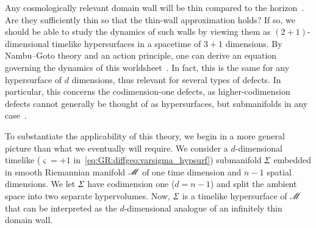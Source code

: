 



\newcommand*\hypsurf{\ALIAShypsurf}             %
\newcommand*\sppt{\ALIASsppt}                   %
\newcommand*\pert{\ALIASpert}                   %
\newcommand*\hypacc{\widehat}                   %
\newcommand*\Ft{\ALIASFt}                       %
\newcommand*\dummy{\ALIASdummy}                 %
\newcommand*\Tw{\ALIASTw}
\newcommand*\Twf{\ALIASTwf}







Any cosmologically relevant domain wall will be thin compared to the horizon~\citep{pressDynamicalEvolutionDomain1989}. Are they sufficiently thin so that the thin-wall approximation holds? If so, we should be able to study the dynamics of such walls by viewing them as $(2+1)$-dimensional timelike hypersurfaces in a spacetime of $3+1$ dimensions. 
By Nambu--Goto theory and an action principle, one can derive an equation governing the dynamics of this worldsheet~\citep{vilenkinCosmicStringsOther1994}. In fact, this is the same for any hypersurface of $d$ dimensions, thus relevant for several types of defects. In particular, this concerns the codimension-one defects, as higher-codimension defects cannot generally be thought of as hypersurfaces, but submanifolds in any case~\citep{vachaspatiKinksDomainWalls2006}. 




To substantiate the applicability of this theory, we begin in a more general picture than what we eventually will require. We consider a $d$-dimensional timelike ($\varsigma = +1$ in~\cref{eq:GR:diffgeo:varsigma_hypsurf}) submanifold $\hypsurf$ embedded in smooth Riemannian manifold $\mathscr{M}$ of one time dimension and $n-1$ spatial dimensions. 
We let $\hypsurf$ have codimension one ($d=n-1$) and split the ambient space into two separate hypervolumes. Now, $\hypsurf$ is a timelike hypersurface of $\mathscr{M}$ that can be interpreted as the $d$-dimensional analogue of an infinitely thin domain wall. 


